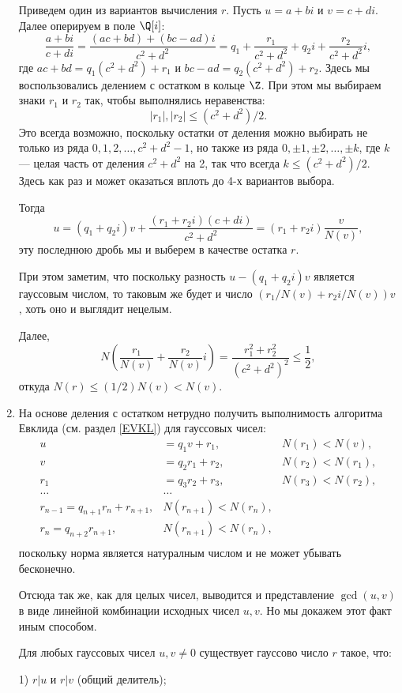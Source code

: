 \begin{enumerate}
Приведем один из вариантов вычисления $r$. Пусть $u=a+bi$ и $v=c+di$. Далее оперируем в поле $\Q[i]$:
$$
\frac{a+bi}{c+di}=\frac{(ac+bd)+(bc-ad)i}{c^2+d^2}=q_1+\frac{r_1}{c^2+d^2}+q_2i+\frac{r_2}{c^2+d^2}i,
$$
где $ac+bd=q_1(c^2+d^2)+r_1$ и $bc-ad=q_2(c^2+d^2)+r_2$. Здесь мы воспользовались делением с остатком в кольце $\Z$. При этом мы выбираем знаки $r_1$ и $r_2$ так, чтобы выполнялись неравенства:
$$
|r_1|,|r_2|\le (c^2+d^2)/2.
$$
Это всегда возможно, поскольку остатки от деления можно выбирать не только из ряда $0,1,2,\dots,c^2+d^2-1$, но также из ряда
$0,\pm 1,\pm 2,\dots,\pm k$, где $k$ --- целая часть от деления $c^2+d^2$ на 2, так что всегда $k\le(c^2+d^2)/2$. Здесь как раз и может оказаться вплоть до 4-х вариантов выбора.

Тогда
$$
u=(q_1+q_2i)v+\frac{(r_1+r_2i)(c+di)}{c^2+d^2}=(r_1+r_2i)\frac{v}{N(v)},
$$
эту последнюю дробь мы и выберем в качестве остатка $r$.

При этом заметим, что поскольку разность $u-(q_1+q_2i)v$ является гауссовым числом, то таковым же будет и число $(r_1/N(v)+r_2i/N(v))v$, хоть оно и выглядит нецелым.

Далее,
$$
N\left(\frac{r_1}{N(v)}+\frac{r_2}{N(v)}i\right)=\frac{r_1^2+r_2^2}{(c^2+d^2)^2}\le \frac 12,
$$
откуда $N(r)\le (1/2)N(v)<N(v)$.

\item На основе деления с остатком нетрудно получить выполнимость алгоритма Евклида (см. раздел \ref{EVKL}) для гауссовых чисел:
\begin{align*}
u & = q_1v + r_1, &  N(r_1)<N(v),\\
v & = q_2r_1 + r_2, &  N(r_2)<N(r_1),\\
r_1 & = q_3r_2 + r_3, &  N(r_3)<N(r_2),\\
\dots & \dots & \\
r_{n-1} = q_{n+1}r_n + r_{n+1}, &  N(r_{n+1})<N(r_n),\\
r_{n} = q_{n+2}r_{n+1}, &  N(r_{n+1})<N(r_n),\\
\end{align*}
поскольку норма является натуралным числом и не может убывать бесконечно.

Отсюда так же, как для целых чисел, выводится и представление $\gcd(u,v)$ в виде линейной комбинации исходных чисел $u,v$. Но мы докажем этот факт иным способом.
\begin{lem}\label{NOD}
Для любых гауссовых чисел $u,v\ne 0$ существует гауссово число $r$ такое, что:

\textup{1)} $r|u$ и $r|v$ (общий делитель);


\end{lem}
\end{enumerate}
